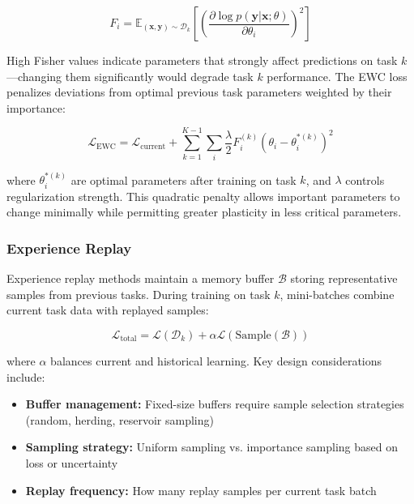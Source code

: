 \documentclass[conference]{IEEEtran}
\begin{document}
\begin{equation}
F_i = \mathbb{E}_{(\mathbf{x},\mathbf{y}) \sim \mathcal{D}_k}\left[\left(\frac{\partial \log p(\mathbf{y}|\mathbf{x}; \theta)}{\partial \theta_i}\right)^2\right]
\end{equation}

High Fisher values indicate parameters that strongly affect predictions on task $k$—changing them significantly would degrade task $k$ performance. The EWC loss penalizes deviations from optimal previous task parameters weighted by their importance:

\begin{equation}
\mathcal{L}_{\text{EWC}} = \mathcal{L}_{\text{current}} + \sum_{k=1}^{K-1} \sum_i \frac{\lambda}{2} F_i^{(k)} (\theta_i - \theta_i^{*(k)})^2
\end{equation}

where $\theta_i^{*(k)}$ are optimal parameters after training on task $k$, and $\lambda$ controls regularization strength. This quadratic penalty allows important parameters to change minimally while permitting greater plasticity in less critical parameters.

\subsubsection{Experience Replay}

Experience replay methods \cite{rebuffi2017icarl} maintain a memory buffer $\mathcal{B}$ storing representative samples from previous tasks. During training on task $k$, mini-batches combine current task data with replayed samples:

\begin{equation}
\mathcal{L}_{\text{total}} = \mathcal{L}(\mathcal{D}_k) + \alpha \mathcal{L}(\text{Sample}(\mathcal{B}))
\end{equation}

where $\alpha$ balances current and historical learning. Key design considerations include:

\begin{itemize}
\item \textbf{Buffer management:} Fixed-size buffers require sample selection strategies (random, herding, reservoir sampling)
\item \textbf{Sampling strategy:} Uniform sampling vs. importance sampling based on loss or uncertainty
\item \textbf{Replay frequency:} How many replay samples per current task batch
\end{itemize}
\end{document}
